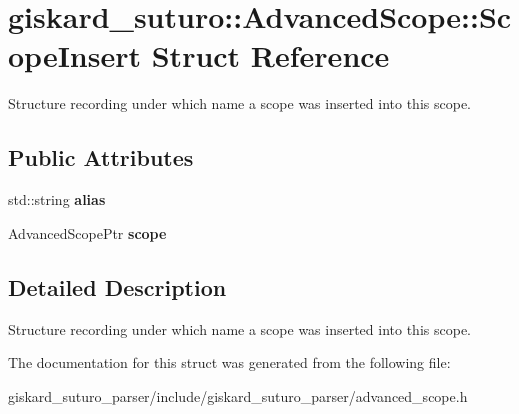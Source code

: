 \hypertarget{structgiskard__suturo_1_1AdvancedScope_1_1ScopeInsert}{\section{giskard\-\_\-suturo\-:\-:Advanced\-Scope\-:\-:Scope\-Insert Struct Reference}
\label{structgiskard__suturo_1_1AdvancedScope_1_1ScopeInsert}
}


Structure recording under which name a scope was inserted into this scope.  


\subsection*{Public Attributes}
\begin{DoxyCompactItemize}
\item 
\hypertarget{structgiskard__suturo_1_1AdvancedScope_1_1ScopeInsert_a34c28bde3499ef56d6415a70cba3378f}{std\-::string {\bfseries alias}}\label{structgiskard__suturo_1_1AdvancedScope_1_1ScopeInsert_a34c28bde3499ef56d6415a70cba3378f}

\item 
\hypertarget{structgiskard__suturo_1_1AdvancedScope_1_1ScopeInsert_ac1c58d4b5134c8eba778d9049d06b78e}{Advanced\-Scope\-Ptr {\bfseries scope}}\label{structgiskard__suturo_1_1AdvancedScope_1_1ScopeInsert_ac1c58d4b5134c8eba778d9049d06b78e}

\end{DoxyCompactItemize}


\subsection{Detailed Description}
Structure recording under which name a scope was inserted into this scope. 

The documentation for this struct was generated from the following file\-:\begin{DoxyCompactItemize}
\item 
giskard\-\_\-suturo\-\_\-parser/include/giskard\-\_\-suturo\-\_\-parser/advanced\-\_\-scope.\-h\end{DoxyCompactItemize}
